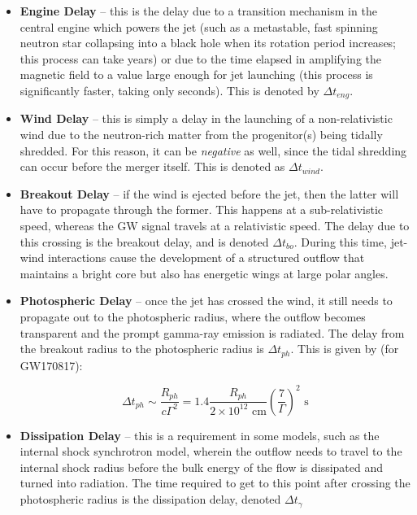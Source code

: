     \begin{itemize}

        \item \textbf{Engine Delay} -- this is the delay due to a transition mechanism
            in the central engine which powers the jet (such as a metastable, fast
            spinning neutron star collapsing into a black hole when its rotation period
            increases; this process can take years) or due to the time elapsed in
            amplifying the magnetic field to a value large enough for jet launching
            (this process is significantly faster, taking only seconds). This is denoted
            by $\Delta t_{eng}$.

        \item \textbf{Wind Delay} -- this is simply a delay in the launching of a
            non-relativistic wind due to the neutron-rich matter from the progenitor(s)
            being tidally shredded. For this reason, it can be \textit{negative} as
            well, since the tidal shredding can occur before the merger itself. This is
            denoted as $\Delta t_{wind}$.

        \item \textbf{Breakout Delay} -- if the wind is ejected before the jet, then the
            latter will have to propagate through the former. This happens at a
            sub-relativistic speed, whereas the GW signal travels at a relativistic
            speed. The delay due to this crossing is the breakout delay, and is denoted
            $\Delta t_{bo}$. During this time, jet-wind interactions cause the
            development of a structured outflow that maintains a bright core but also
            has energetic wings at large polar angles.

        \item \textbf{Photospheric Delay} --  once the jet has crossed the wind, it
            still needs to propagate out to the photospheric radius, where the outflow
            becomes transparent and the prompt gamma-ray emission is radiated. The delay
            from the breakout radius to the photospheric radius is $\Delta t_{ph}$. This
            is given by (for GW170817):

            \begin{equation}
                \label{eq:4}
                \Delta t_{ph} \sim \dfrac{R_{ph}}{c \Gamma^2} =
                    1.4 \dfrac{R_{ph}}{2 \times 10^{12} \text{ cm}}
                    \left( \dfrac{7} {\Gamma} \right)^2 \text{ s}
            \end{equation}

        \item \textbf{Dissipation Delay} -- this is a requirement in some models, such
            as the internal shock synchrotron model, wherein the outflow needs to travel
            to the internal shock radius before the bulk energy of the flow is
            dissipated and turned into radiation. The time required to get to this point
            after crossing the photospheric radius is the dissipation delay, denoted
            $\Delta t_{\gamma}$

    \end{itemize}

